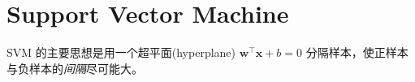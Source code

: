 \section{Support Vector Machine}
	SVM 的主要思想是用一个超平面(hyperplane) $ \bm{w}^\intercal \bm{x} + b = 0 $ 分隔样本，使正样本与负样本的\emph{间隔}尽可能大。
	
	
		
	
		
	
	
